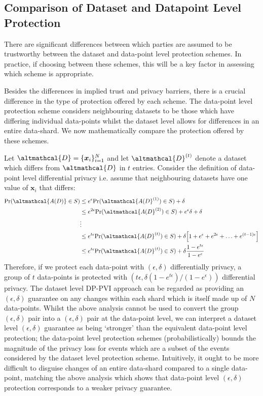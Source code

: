 \subsection{Comparison of Dataset and Datapoint Level Protection}
\label{sec:comparison}
There are significant differences between which parties are assumed to be trustworthy between the dataset and data-point level protection schemes. In practice, if choosing between these schemes, this will be a key factor in assessing which scheme is appropriate. 

Besides the differences in implied trust and privacy barriers, there is a crucial difference in the type of protection offered by each scheme. The data-point level protection scheme considers neighbouring datasets to be those which have differing individual data-points whilst the dataset level allows for differences in an entire data-shard. We now mathematically compare the protection offered by these schemes. 

Let $\altmathcal{D} = \lbrace \bm{x}_i \rbrace_{i=1}^N$ and let $\altmathcal{D}^{(t)}$ denote a dataset which differs from $\altmathcal{D}$ in $t$ entries. Consider the definition of data-point level differential privacy i.e. assume that neighbouring datasets have one value of $\bm{x}_i$ that differs:
\begin{align}
\text{Pr}(\altmathcal{A(D)} \in S) &\leq e^\epsilon \text{Pr}(\altmathcal{A(D}^{(1)}) \in S) + \delta \nonumber \\
&\leq e^{2\epsilon} \text{Pr}(\altmathcal{A(D}^{(2)}) \in S) + e^\epsilon \delta + \delta \nonumber \\
&\vdots \nonumber \\
&\leq e^{t\epsilon} \text{Pr}(\altmathcal{A(D}^{(t)}) \in S) + \delta \Big[ 1 + e^{\epsilon} + e^{2\epsilon} + \ldots +  e^{(t-1)\epsilon} \Big] \nonumber \\
&\leq e^{t\epsilon} \text{Pr}(\altmathcal{A(D}^{(t)}) \in S) + \delta \frac{1-e^{t\epsilon}}{1-e^{\epsilon}}
\end{align}
Therefore, if we protect each data-point with $(\epsilon, \delta)$ differentially privacy, a group of $t$ data-points is protected with $(t \epsilon, \delta (1-e^{t\epsilon})/({1-e^{\epsilon}}))$ differential privacy. The dataset level DP-PVI approach can be regarded as providing an $(\epsilon, \delta)$ guarantee on any changes within each shard which is itself made up of $N$ data-points. Whilst the above analysis cannot be used to convert the group $(\epsilon, \delta)$ pair into a $(\epsilon, \delta)$ pair at the data-point level, we can interpret a dataset level $(\epsilon, \delta)$ guarantee as being `stronger' than the equivalent data-point level protection; the data-point level protection schemes (probabilistically) bounds the magnitude of the privacy loss for events which are a subset of the events considered by the dataset level protection scheme. Intuitively, it ought to be more difficult to disguise changes of an entire data-shard compared to a single data-point, matching the above analysis which shows that data-point level $(\epsilon, \delta)$ protection corresponds to a weaker privacy guarantee. 

